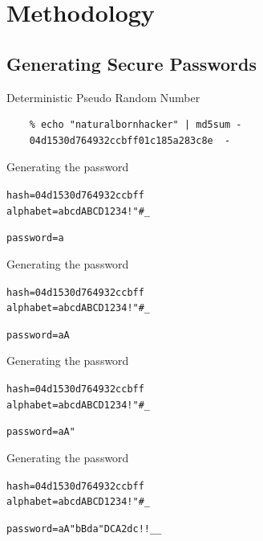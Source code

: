 \documentclass{beamer}
\begin{document}
\section{Methodology}
\subsection{Generating Secure Passwords}
\begin{frame}[fragile]{Deterministic Pseudo Random Number}
  \begin{block}{}
    \begin{verbatim}
    % echo "naturalbornhacker" | md5sum -
    04d1530d764932ccbff01c185a283c8e  -
    \end{verbatim}
  \end{block}
\end{frame}

\begin{frame}[fragile]{Generating the password}
  \begin{block}{}
    \begin{alltt}
hash = {\color{red}0}4d1530d764932ccbff
alphabet = {\color{green}a}bcdABCD1234!"#_

password = a
    \end{alltt}
  \end{block}
\end{frame}

\begin{frame}[fragile]{Generating the password}
  \begin{block}{}
    \begin{alltt}
hash = 0{\color{red}4}d1530d764932ccbff
alphabet = abcd{\color{green}A}BCD1234!"#_

password = aA
    \end{alltt}
  \end{block}
\end{frame}

\begin{frame}[fragile]{Generating the password}
  \begin{block}{}
    \begin{alltt}
hash = 04{\color{red}d}1530d764932ccbff
alphabet = abcdABCD1234!{\color{green}"}#_

password = aA"
    \end{alltt}
  \end{block}
\end{frame}


\begin{frame}[fragile]{Generating the password}
  \begin{block}{}
    \begin{alltt}
hash = 04d1530d764932ccbff
alphabet = abcdABCD1234!"#_

password = aA"bBda"DCA2dc!!__
    \end{alltt}
  \end{block}
\end{frame}
\end{document}
